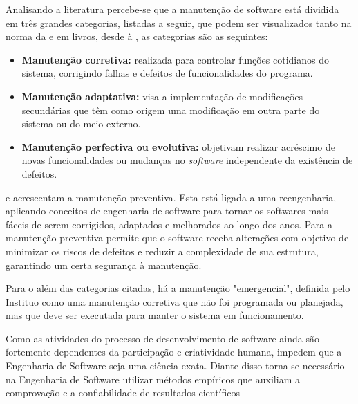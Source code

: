 
Analisando a literatura percebe-se que a manutenção de software está dividida em três grandes categorias, listadas a seguir, que podem ser visualizados tanto na norma da \cite{ieee1219} e em livros, desde \cite{lientz1980software} à \cite{pfleeger2004engenharia}, as categorias são as seguintes:
\begin{itemize}
\item \textbf{Manutenção corretiva:} realizada para controlar funções cotidianos do sistema, corrigindo falhas e defeitos de funcionalidades do programa.

\item \textbf{Manutenção adaptativa:} visa a implementação de modificações secundárias que têm como origem uma modificação em outra parte do sistema ou do meio externo.

\item \textbf{Manutenção perfectiva ou evolutiva:} objetivam realizar acréscimo de novas funcionalidades ou mudanças no \textit{software} independente da existência de defeitos.
\end{itemize}

 e  acrescentam a manutenção preventiva. Esta está ligada a uma reengenharia, aplicando conceitos de engenharia de software para tornar os softwares mais fáceis de serem corrigidos, adaptados e melhorados ao longo dos anos. Para  a manutenção preventiva permite que o software receba alterações com objetivo de minimizar os riscos de defeitos e reduzir a complexidade de sua estrutura, garantindo um certa segurança à manutenção.


Para o  além das categorias citadas, há a manutenção "emergencial", definida pelo Instituo como uma manutenção corretiva que não foi programada ou planejada, mas que deve ser executada para manter o sistema em funcionamento.

Como as atividades do processo de desenvolvimento de software ainda são fortemente dependentes da participação e criatividade humana, impedem que a Engenharia de Software seja uma ciência exata. Diante disso torna-se necessário na Engenharia de Software utilizar métodos empíricos que auxiliam a comprovação e a confiabilidade de resultados científicos

